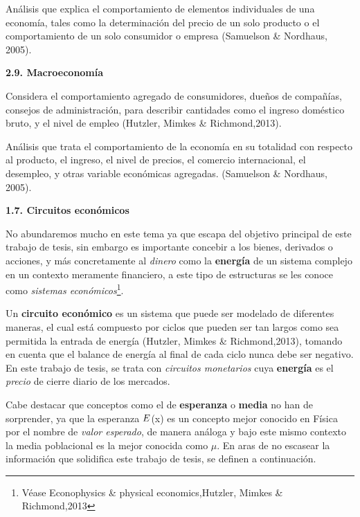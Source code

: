 Análisis que explica el comportamiento de elementos individuales de una economía, tales como la determinación del precio de un solo producto o el comportamiento de un solo consumidor o empresa (Samuelson \& Nordhaus, 2005).
\newline

{
\noindent
\Large  \textbf{2.9. Macroeconomía} 
}

Considera el comportamiento agregado de consumidores, dueños de compañías, consejos de administración, para describir cantidades como el ingreso doméstico bruto, y el nivel de empleo  (Hutzler, Mimkes \& Richmond,2013).
\newline

Análisis que trata el comportamiento de la economía en su totalidad con respecto al producto, el ingreso, el nivel de precios, el comercio internacional, el desempleo, y otras variable económicas agregadas. (Samuelson \& Nordhaus, 2005).
\newline

{
\noindent
\Large  \textbf{1.7. Circuitos económicos} 
}

No abundaremos mucho en este tema ya que escapa del objetivo principal de este trabajo de tesis, sin embargo es importante concebir a los bienes, derivados o acciones, y más concretamente al \textit{dinero} como la \textbf{energía} de un sistema complejo en un contexto meramente financiero, a este tipo de estructuras se les conoce como \textit{sistemas económicos}\footnote{Véase Econophysics \& physical economics,Hutzler, Mimkes \& Richmond,2013 }. 
\newline

Un \textbf{circuito económico} es un sistema que puede ser modelado de diferentes maneras, el cual está compuesto por ciclos que pueden ser tan largos como sea permitida la entrada de energía (Hutzler, Mimkes \& Richmond,2013), tomando en cuenta que el balance de energía al final de cada ciclo nunca debe ser negativo. En este trabajo de tesis, se trata con \textit{circuitos monetarios} cuya \textbf{energía} es el \textit{precio} de cierre diario de los mercados.
\newline

Cabe destacar que conceptos como el de \textbf{esperanza} o  \textbf{media} no han de sorprender, ya que la esperanza $\boldmath{E}$(x) es un concepto mejor conocido en Física por el nombre de \textit{valor esperado}, de manera análoga y bajo este mismo contexto la media poblacional es la mejor conocida como $\mu$. En aras de no escasear la información que solidifica este trabajo de tesis, se definen a continuación.

